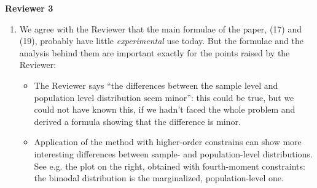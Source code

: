 \documentclass{article}
\begin{document}
\textbf{Reviewer 3}
\begin{enumerate}
\item We agree with the Reviewer that the main formulae of the paper, (17)
  and (19), probably have little \emph{experimental} use today. But the
  formulae and the analysis behind them are important exactly for the
  points raised by the Reviewer:
  \begin{itemize}
  \item \begin{minipage}[t]{0.74\linewidth}The Reviewer says \enquote{the
        differences between the sample level and population level
        distribution seem minor}: this could be true, but we could not have
      known this, if we hadn't faced the whole problem and derived a
      formula showing that the difference is minor.
    \end{minipage}\hspace{\fill}
  \item
    \begin{minipage}[t]{0.74\linewidth}
      Application of the method with higher-order constrains can show more
      interesting differences between sample- and population-level
      distributions. See e.g. the plot on the right, obtained with
      fourth-moment constraints: the bimodal
      distribution is the marginalized, population-level one.
    \end{minipage}

\end{itemize}
\end{enumerate}
\end{document}
